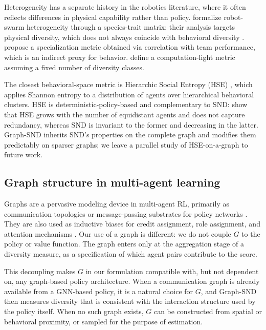 \documentclass[11pt]{article}
\theoremstyle{plain}
\theoremstyle{definition}
\theoremstyle{remark}
\begin{document}
Heterogeneity has a separate history in the robotics literature, where
it often reflects differences in physical capability rather than
policy. \citet{prorok2017impact} formalize robot-swarm heterogeneity
through a species-trait matrix; their analysis targets physical
diversity, which does not always coincide with behavioral diversity
\citep{stanley2019designing}. \citet{li2004learning} propose a
specialization metric obtained via correlation with team performance,
which is an indirect proxy for behavior. \citet{twu2014measure} define
a computation-light metric assuming a fixed number of diversity
classes.

The closest behavioral-space metric is Hierarchic Social Entropy
(HSE) \citep{balch2000hse}, which applies Shannon entropy to a
distribution of agents over hierarchical behavioral clusters. HSE is
deterministic-policy-based and complementary to SND:
\citet{bettini2025snd} show that HSE grows with the number of
equidistant agents and does not capture redundancy, whereas SND is
invariant to the former and decreasing in the latter. Graph-SND
inherits SND's properties on the complete graph and modifies them
predictably on sparser graphs; we leave a parallel study of
HSE-on-a-graph to future work.

\subsection{Graph structure in multi-agent learning}

Graphs are a pervasive modeling device in multi-agent RL, primarily as
communication topologies or message-passing substrates for policy
networks \citep{sukhbaatar2016learning, blumenkamp2021emergence,
bettini2023hetgppo}. They are also used as inductive biases for
credit assignment, role assignment, and attention mechanisms
\citep{wang2020roma, wang2021rode}. Our use of a graph is different:
we do not couple $G$ to the policy or value function. The graph enters
only at the aggregation stage of a diversity measure, as a
specification of which agent pairs contribute to the score.

This decoupling makes $G$ in our formulation compatible with, but
not dependent on, any graph-based policy architecture. When a
communication graph is already available from a GNN-based policy, it
is a natural choice for $G$, and Graph-SND then measures diversity
that is consistent with the interaction structure used by the policy
itself. When no such graph exists, $G$ can be constructed from
spatial or behavioral proximity, or sampled for the purpose of
estimation.
\end{document}
